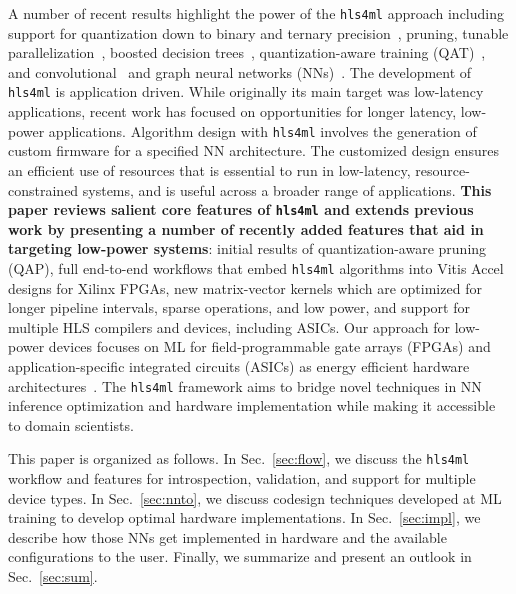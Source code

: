\documentclass[sigconf]{acmart}
\newcommand{\hlsfml}{\texttt{hls4ml}\xspace}
\begin{document}
A number of recent results highlight the power of the \hlsfml approach including support for quantization down to binary and ternary precision~\cite{DiGuglielmo:2020eqx}, pruning, tunable parallelization~\cite{Duarte:2018ite}, boosted decision trees~\cite{Summers:2020xiy}, quantization-aware training (QAT)~\cite{Coelho:2020zfu}, and convolutional~\cite{Aarrestad:2021zos} and graph neural networks (NNs)~\cite{Iiyama:2020wap}. 
The development of \hlsfml is application driven. 
While originally its main target was low-latency applications, recent work has focused on opportunities for longer latency, low-power applications.
Algorithm design with \hlsfml involves the generation of custom firmware for a specified NN architecture.
The customized design ensures an efficient use of resources that is essential to run in low-latency, resource-constrained systems, and is useful across a broader range of applications.
\textbf{This paper reviews salient core features of \hlsfml and extends previous work by presenting a number of recently added features that aid in targeting low-power systems}: initial results of quantization-aware pruning (QAP), full end-to-end workflows that embed \hlsfml algorithms into Vitis Accel designs for Xilinx FPGAs, new matrix-vector kernels which are optimized for longer pipeline intervals, sparse operations, and low power, and support for multiple HLS compilers and devices, including ASICs.
Our approach for low-power devices focuses on ML for field-programmable gate arrays (FPGAs) and application-specific integrated circuits (ASICs) as energy efficient hardware architectures~\cite{GapFPGAsASIC,ComputingsEnergy}.  
The \hlsfml framework aims to bridge novel techniques in NN inference optimization and hardware implementation while making it accessible to domain scientists. 

This paper is organized as follows. 
In Sec.~\ref{sec:flow}, we discuss the \hlsfml workflow and features for introspection, validation, and support for multiple device types.  
In Sec.~\ref{sec:nnto}, we discuss codesign techniques developed at ML training to develop optimal hardware implementations.
In Sec.~\ref{sec:impl}, we describe how those NNs get implemented in hardware and the available configurations to the user.  
Finally, we summarize and present an outlook in Sec.~\ref{sec:sum}.
\end{document}
